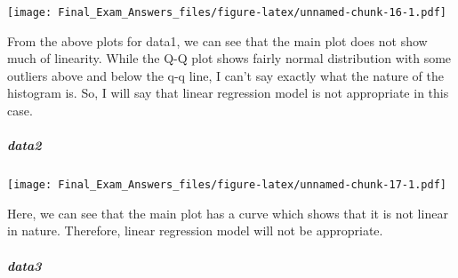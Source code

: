 \documentclass[]{article}
\newenvironment{Shaded}{\begin{snugshade}}{\end{snugshade}}
\newcommand{\KeywordTok}[1]{\textcolor[rgb]{0.13,0.29,0.53}{\textbf{#1}}}
\newcommand{\DataTypeTok}[1]{\textcolor[rgb]{0.13,0.29,0.53}{#1}}
\newcommand{\DecValTok}[1]{\textcolor[rgb]{0.00,0.00,0.81}{#1}}
\newcommand{\StringTok}[1]{\textcolor[rgb]{0.31,0.60,0.02}{#1}}
\newcommand{\OperatorTok}[1]{\textcolor[rgb]{0.81,0.36,0.00}{\textbf{#1}}}
\newcommand{\NormalTok}[1]{#1}
\let\oldsubparagraph\subparagraph
\renewcommand{\subparagraph}[1]{\oldsubparagraph{#1}\mbox{}}
\begin{document}
\texttt{[image: Final\_Exam\_Answers\_files/figure-latex/unnamed-chunk-16-1.pdf]}

From the above plots for data1, we can see that the main plot does not
show much of linearity. While the Q-Q plot shows fairly normal
distribution with some outliers above and below the q-q line, I can't
say exactly what the nature of the histogram is. So, I will say that
linear regression model is not appropriate in this case.

\subparagraph{data2}\label{data2}

\begin{Shaded}
\end{Shaded}

\texttt{[image: Final\_Exam\_Answers\_files/figure-latex/unnamed-chunk-17-1.pdf]}

Here, we can see that the main plot has a curve which shows that it is
not linear in nature. Therefore, linear regression model will not be
appropriate.

\subparagraph{data3}\label{data3}

\begin{Shaded}
\end{Shaded}
\end{document}
